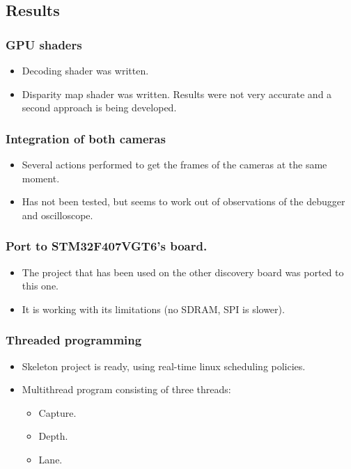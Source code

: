 \subsection{Results}


\subsubsection{GPU shaders}
\begin{itemize}
	\item Decoding shader was written.
	\item Disparity map shader was written. Results were not very accurate and a second approach is being developed.
\end{itemize}


\subsubsection{Integration of both cameras}
\begin{itemize}
	\item Several actions performed to get the frames of the cameras at the same moment.
	\item Has not been tested, but seems to work out of observations of the debugger and oscilloscope.
\end{itemize}


\subsubsection{Port to STM32F407VGT6's board.}
\begin{itemize}
	\item The project that has been used on the other discovery board was ported to this one.
	\item It is working with its limitations (no SDRAM, SPI is slower).
\end{itemize}


\subsubsection{Threaded programming}
\begin{itemize}
	\item Skeleton project is ready, using real-time linux scheduling policies.
	\item Multithread program consisting of three threads:
	\begin{itemize}
		\item Capture.
		\item Depth.
		\item Lane.
	\end{itemize}
\end{itemize}
